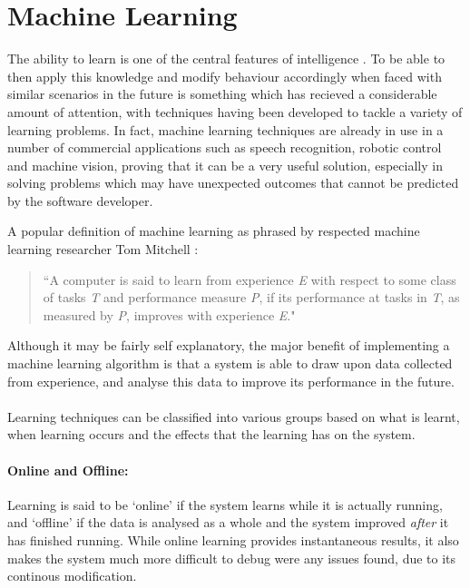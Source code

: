 \documentclass[a4paper,oneside]{report}
\begin{document}
\section{Machine Learning}

The ability to learn is one of the central features of intelligence \cite{Langley:1996zr}. To be able to then apply this knowledge and modify behaviour accordingly when faced with similar scenarios in the future is something which has recieved a considerable amount of attention, with techniques having been developed to tackle a variety of learning problems. In fact, machine learning techniques are already in use in a number of commercial applications such as speech recognition, robotic control and machine vision, proving that it can be a very useful solution, especially in solving problems which may have unexpected outcomes that cannot be predicted by the software developer.

\noindent A popular definition of machine learning as phrased by respected machine learning researcher Tom Mitchell \cite{mitchell1997machine}: 
\begin{quotation}``A computer is said to learn from experience \emph{E} with respect to some class of tasks \emph{T} and performance measure \emph{P}, if its performance at tasks in \emph{T}, as measured by \emph{P}, improves with experience \emph{E}."
\end{quotation}

Although it may be fairly self explanatory, the major benefit of implementing a machine learning algorithm is that a system is able to draw upon data collected from experience, and analyse this data to improve its performance in the future.

\paragraph{} Learning techniques can be classified into various groups based on what is learnt, when learning occurs and the effects that the learning has on the system. 

\paragraph{Online and Offline:} Learning is said to be `online' if the system learns while it is actually running, and `offline' if the data is analysed as a whole and the system improved \emph{after} it has finished running. While online learning provides instantaneous results, it also makes the system much more difficult to debug were any issues found, due to its continous modification.
\end{document}
